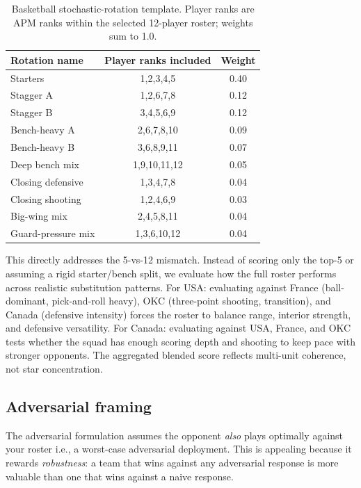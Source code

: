 \documentclass[11pt,letterpaper]{article}
\begin{document}
\begin{table}[h]
  \centering
  \small
  \caption{Basketball stochastic-rotation template. Player ranks are
    APM ranks within the selected 12-player roster; weights sum to 1.0.}
  \begin{tabular}{l c c}
    \toprule
    Rotation name & Player ranks included & Weight \\
    \midrule
    Starters & 1,2,3,4,5 & 0.40 \\
    Stagger A & 1,2,6,7,8 & 0.12 \\
    Stagger B & 3,4,5,6,9 & 0.12 \\
    Bench-heavy A & 2,6,7,8,10 & 0.09 \\
    Bench-heavy B & 3,6,8,9,11 & 0.07 \\
    Deep bench mix & 1,9,10,11,12 & 0.05 \\
    Closing defensive & 1,3,4,7,8 & 0.04 \\
    Closing shooting & 1,2,4,6,9 & 0.03 \\
    Big-wing mix & 2,4,5,8,11 & 0.04 \\
    Guard-pressure mix & 1,3,6,10,12 & 0.04 \\
    \bottomrule
  \end{tabular}
\end{table}

This directly addresses the 5-vs-12 mismatch. Instead of scoring only
the top-5 or assuming a rigid starter/bench split, we evaluate how the
full roster performs across realistic substitution patterns. For USA:
evaluating against France (ball-dominant, pick-and-roll heavy), OKC
(three-point shooting, transition), and Canada (defensive intensity)
forces the roster to balance range, interior strength, and defensive
versatility. For Canada: evaluating against USA, France, and OKC tests
whether the squad has enough scoring depth and shooting to keep pace
with stronger opponents.
The aggregated blended score reflects multi-unit coherence, not star
concentration.

\subsection{Adversarial framing}

The adversarial formulation assumes the opponent \emph{also} plays
optimally against your roster i.e., a worst-case adversarial
deployment. This is appealing because it rewards \emph{robustness}: a
team that wins against any adversarial response is more valuable than
one that wins against a naive response.
\end{document}
